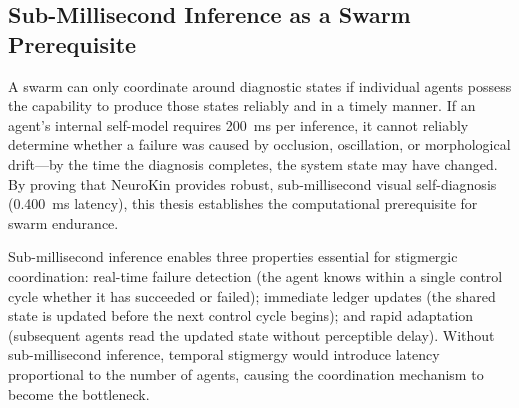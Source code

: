 \documentclass[12pt,a4paper,oneside]{report}
\begin{document}
\subsection{Sub-Millisecond Inference as a Swarm Prerequisite}
A swarm can only coordinate around diagnostic states if individual agents possess the capability to produce those states reliably and in a timely manner. If an agent's internal self-model requires 200~ms per inference, it cannot reliably determine whether a failure was caused by occlusion, oscillation, or morphological drift---by the time the diagnosis completes, the system state may have changed. By proving that NeuroKin provides robust, sub-millisecond visual self-diagnosis (0.400~ms latency), this thesis establishes the computational prerequisite for swarm endurance.

Sub-millisecond inference enables three properties essential for stigmergic coordination: real-time failure detection (the agent knows within a single control cycle whether it has succeeded or failed); immediate ledger updates (the shared state is updated before the next control cycle begins); and rapid adaptation (subsequent agents read the updated state without perceptible delay). Without sub-millisecond inference, temporal stigmergy would introduce latency proportional to the number of agents, causing the coordination mechanism to become the bottleneck.
\end{document}

